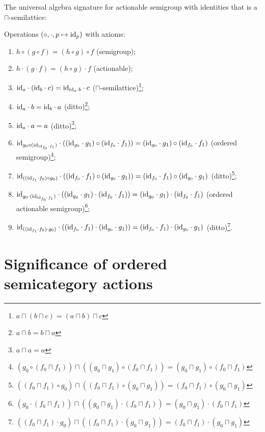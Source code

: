 \documentclass[a4paper,oneside,english,reqno]{amsart}
\begin{document}
\begin{obvious}
The universal algebra signature for actionable semigroup with identities that is a $\sqcap$-semilattice:

Operations $({\circ}, {\cdot}, p\mapsto{\operatorname{id}}_p)$ with axioms:
\begin{enumerate}
\item $h\circ(g\circ f) = (h\circ g)\circ f$ (semigroup);
\item $h\cdot(g\cdot f) = (h\circ g)\cdot f$ (actionable);
\item ${\operatorname{id}}_a\cdot({\operatorname{id}}_b\cdot c) = {\operatorname{id}}_{{\operatorname{id}}_a\cdot b}\cdot c$ ($\sqcap$-semilattice)\footnote{$a\sqcap(b\sqcap c) = (a\sqcap b)\sqcap c$};
\item ${\operatorname{id}}_a\cdot b = {\operatorname{id}}_b\cdot a$ (ditto)\footnote{$a\sqcap b = b\sqcap a$};
\item ${\operatorname{id}}_a\cdot a = a$ (ditto)\footnote{$a\sqcap a=a$};
\item ${\operatorname{id}}_{g_0\circ({\operatorname{id}}_{{\operatorname{id}}_{f_0}\cdot f_1})}\cdot(({\operatorname{id}}_{g_0}\cdot g_1)\circ({\operatorname{id}}_{f_0}\cdot f_1)) = ({\operatorname{id}}_{g_0}\cdot g_1)\circ({\operatorname{id}}_{f_0}\cdot f_1)$ (ordered semigroup)\footnote{$(g_0\circ(f_0\sqcap f_1))\sqcap((g_0\sqcap g_1)\circ(f_0\sqcap f_1)) = (g_0\sqcap g_1)\circ(f_0\sqcap f_1)$};
\item ${\operatorname{id}}_{(({\operatorname{id}}_{f_1}\cdot f_0)\circ g_0)}\cdot(({\operatorname{id}}_{f_0}\cdot f_1)\circ({\operatorname{id}}_{g_0}\cdot g_1)) = ({\operatorname{id}}_{f_0}\cdot f_1)\circ({\operatorname{id}}_{g_0}\cdot g_1)$ (ditto)\footnote{$((f_0\sqcap f_1)\circ g_0)\sqcap((f_0\sqcap f_1)\circ(g_0\sqcap g_1)) = (f_0\sqcap f_1)\circ(g_0\sqcap g_1)$};
\item ${\operatorname{id}}_{g_0\cdot({\operatorname{id}}_{{\operatorname{id}}_{f_0}\cdot f_1})}\cdot(({\operatorname{id}}_{g_0}\cdot g_1)\cdot({\operatorname{id}}_{f_0}\cdot f_1)) = ({\operatorname{id}}_{g_0}\cdot g_1)\cdot({\operatorname{id}}_{f_0}\cdot f_1)$ (ordered actionable semigroup)\footnote{$(g_0\cdot(f_0\sqcap f_1))\sqcap((g_0\sqcap g_1)\cdot(f_0\sqcap f_1)) = (g_0\sqcap g_1)\cdot(f_0\sqcap f_1)$};
\item ${\operatorname{id}}_{(({\operatorname{id}}_{f_1}\cdot f_0)\cdot g_0)}\cdot(({\operatorname{id}}_{f_0}\cdot f_1)\cdot({\operatorname{id}}_{g_0}\cdot g_1)) = ({\operatorname{id}}_{f_0}\cdot f_1)\cdot({\operatorname{id}}_{g_0}\cdot g_1)$ (ditto)\footnote{$((f_0\sqcap f_1)\cdot g_0)\sqcap((f_0\sqcap f_1)\cdot(g_0\sqcap g_1)) = (f_0\sqcap f_1)\cdot(g_0\sqcap g_1)$}.
\end{enumerate}
\end{obvious}

\section{Significance of ordered semicategory actions}
\end{document}
